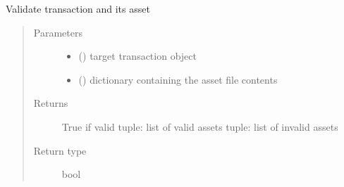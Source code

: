 \documentclass[letterpaper,10pt,english]{sphinxmanual}
\begin{document}

\begin{fulllineitems}
\label{\detokenize{bbc1.core.bbclib:bbc1.core.bbclib.to_4byte}}
\end{fulllineitems}


\begin{fulllineitems}
\label{\detokenize{bbc1.core.bbclib:bbc1.core.bbclib.to_8byte}}
\end{fulllineitems}


\begin{fulllineitems}
\label{\detokenize{bbc1.core.bbclib:bbc1.core.bbclib.to_bigint}}
\end{fulllineitems}


\begin{fulllineitems}
\label{\detokenize{bbc1.core.bbclib:bbc1.core.bbclib.validate_transaction_object}}
Validate transaction and its asset
\begin{quote}\begin{description}
\item[{Parameters}] \leavevmode\begin{itemize}
\item {} 
 ({\hyperref[\detokenize{bbc1.core.bbclib:bbc1.core.bbclib.BBcTransaction}]{}}) \textendash{} target transaction object

\item {} 
 () \textendash{} dictionary containing the asset file contents

\end{itemize}

\item[{Returns}] \leavevmode
True if valid
tuple: list of valid assets
tuple: list of invalid assets

\item[{Return type}] \leavevmode
bool

\end{description}\end{quote}

\end{fulllineitems}
\end{document}
